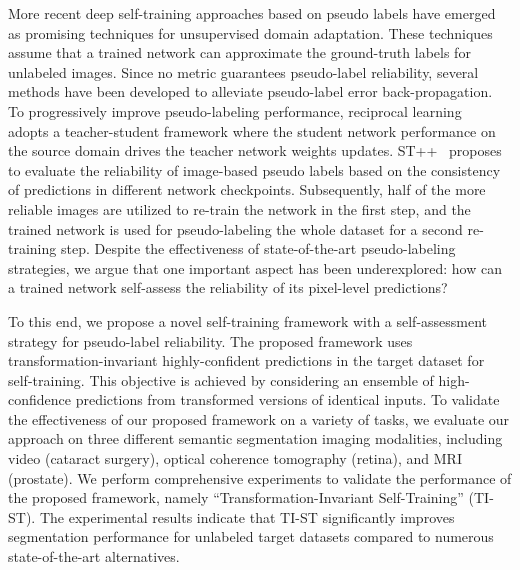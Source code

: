 More recent deep self-training approaches based on pseudo labels have emerged as promising techniques for unsupervised domain adaptation. These techniques assume that a trained network can approximate the ground-truth labels for unlabeled images. Since no metric guarantees pseudo-label reliability, several methods have been developed to alleviate pseudo-label error back-propagation. To progressively improve pseudo-labeling performance, reciprocal learning~ adopts a teacher-student framework where the student network performance on the source domain drives the teacher network weights updates. ST++~ proposes to evaluate the reliability of image-based pseudo labels based on the consistency of predictions in different network checkpoints. Subsequently, half of the more reliable images are utilized to re-train the network in the first step, and the trained network is used for pseudo-labeling the whole dataset for a second re-training step. Despite the effectiveness of state-of-the-art pseudo-labeling strategies, we argue that one important aspect has been underexplored: how can a trained network self-assess the reliability of its pixel-level predictions?

To this end, we propose a novel self-training framework with a self-assessment strategy for pseudo-label reliability. The proposed framework uses transformation-invariant highly-confident predictions in the target dataset for self-training. This objective is achieved by considering an ensemble of high-confidence predictions from transformed versions of identical inputs. To validate the effectiveness of our proposed framework on a variety of tasks, we evaluate our approach on three different semantic segmentation imaging modalities, including video (cataract surgery), optical coherence tomography (retina), and MRI (prostate). We perform comprehensive experiments to validate the performance of the proposed framework, namely ``Transformation-Invariant Self-Training'' (TI-ST). The experimental results indicate that TI-ST significantly improves segmentation performance for unlabeled target datasets compared to numerous state-of-the-art alternatives.
